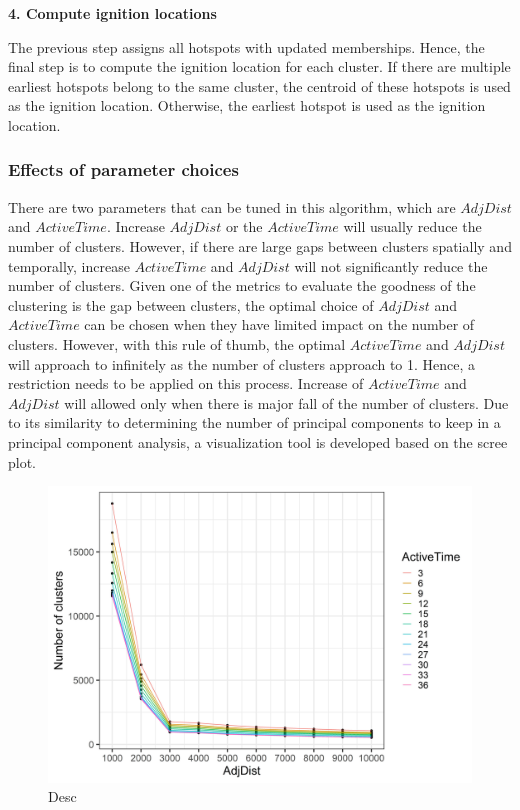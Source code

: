 \textbf{4. Compute ignition locations}

The previous step assigns all hotspots with updated memberships. Hence,
the final step is to compute the ignition location for each cluster. If
there are multiple earliest hotspots belong to the same cluster, the
centroid of these hotspots is used as the ignition location. Otherwise,
the earliest hotspot is used as the ignition location.

\hypertarget{effects-of-parameter-choices}{%
\subsubsection{Effects of parameter
choices}\label{effects-of-parameter-choices}}

There are two parameters that can be tuned in this algorithm, which are
\(AdjDist\) and \(ActiveTime\). Increase \(AdjDist\) or the
\(ActiveTime\) will usually reduce the number of clusters. However, if
there are large gaps between clusters spatially and temporally, increase
\(ActiveTime\) and \(AdjDist\) will not significantly reduce the number
of clusters. Given one of the metrics to evaluate the goodness of the
clustering is the gap between clusters, the optimal choice of
\(AdjDist\) and \(ActiveTime\) can be chosen when they have limited
impact on the number of clusters. However, with this rule of thumb, the
optimal \(ActiveTime\) and \(AdjDist\) will approach to infinitely as
the number of clusters approach to 1. Hence, a restriction needs to be
applied on this process. Increase of \(ActiveTime\) and \(AdjDist\) will
allowed only when there is major fall of the number of clusters. Due to
its similarity to determining the number of principal components to keep
in a principal component analysis, a visualization tool is developed
based on the scree plot.

\begin{Schunk}
\begin{figure}

{\centering \includegraphics[width=0.8\linewidth]{figures/clustering_tuning_1} 

}

\caption[Desc]{Desc}\label{fig:vis1}
\end{figure}
\end{Schunk}

